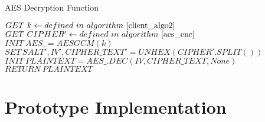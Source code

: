 \begin{algorithm}[H]
	\caption{AES Decryption Function}\label{aes_dec}
	\begin{algorithmic}[1]
		\State $GET\ k \gets defined\ in\ algorithm\ \ref{client_algo2}$
		\State $GET\ CIPHER' \gets defined\ in\ algorithm\ \ref{aes_enc}$
		\State $INIT\ AES\_ = AESGCM(k)$
		\State $SET\ SALT',IV',CIPHER\_TEXT' = UNHEX(CIPHER'.SPLIT())$
		\State $INIT\ PLAINTEXT = AES\_.DEC(IV,CIPHER\_TEXT,None)$
		\State $RETURN\ PLAINTEXT$
		\EndProcedure
	\end{algorithmic}
\end{algorithm}

\section{Prototype Implementation}
\label{sec:prototypeimplementation}

